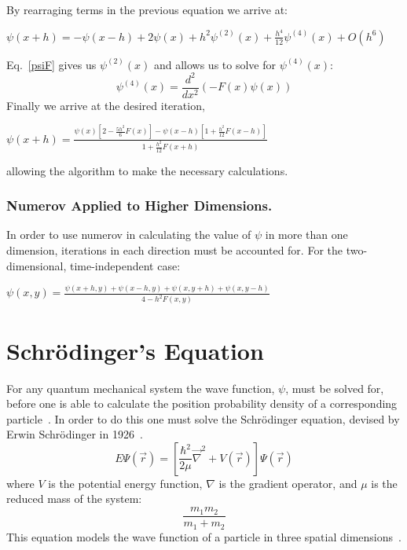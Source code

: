 \documentclass[aps,prl,twocolumn,superscriptaddress]{revtex4-1}
\begin{document}
By rearraging terms in the previous equation we arrive at:
\begin{center}
$\psi(x+h) = -\psi(x-h)+2\psi(x)+h^2\psi^{(2)}(x) + \frac{h^4}{12}\psi^{(4)}(x) + O(h^6)$
\end{center}
Eq.~\ref{psiF} gives us $\psi^{(2)}(x)$ and allows us to solve for $\psi^{(4)}(x)$:
$$\psi^{(4)}(x) = \frac{d^2}{dx^2}(-F(x)\psi(x))$$
Finally we arrive at the desired iteration,
\\
\begin{center}
$\psi(x+h) = \frac{\psi (x) [2-\frac{5h^2}{6} F(x)] - \psi (x-h)[1+\frac{h^2}{12}F(x-h)]}{1+\frac{h^2}{12}F(x+h)}$
\end{center}

allowing the algorithm to make the necessary calculations.

\subsubsection{Numerov Applied to Higher Dimensions.}

In order to use numerov in calculating the value of $\psi$ in more than one dimension, iterations in each direction must 
be accounted for. For the two-dimensional, time-independent case:
\\
\begin{center}
$\psi(x,y) = \frac{\psi(x+h,y) + \psi(x-h,y) + \psi(x,y+h) + \psi(x,y-h)}{4-h^2F(x,y)}$
\end{center}

\section{Schr\"{o}dinger's Equation}

For any quantum mechanical system the wave function, $\psi$, must be solved for, before one is able to 
calculate the position probability density of a corresponding particle~\cite{Javapsi}.  In order to do this one must solve 
the Schr\"{o}dinger equation, devised by Erwin Schr\"{o}dinger in 1926~\cite{Schrodinger_wave}.
\begin{equation}
 E\Psi(\vec r) = [\frac{\hbar^2}{2\mu}\vec\nabla^2 + V(\vec r)]\Psi(\vec r)	\label{SWE}
\end{equation}
where $V$ is the potential energy function, $\nabla$ is the gradient operator, and $\mu$ is the reduced mass of the system:
$$\frac{m_1m_2}{m_1+m_2}$$
This equation models the wave function of a particle in three spatial dimensions~\cite{Sch_eq}.
\end{document}
